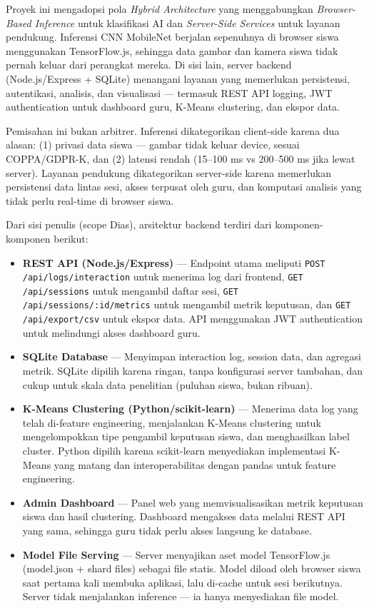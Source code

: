 Proyek ini mengadopsi pola \textit{Hybrid Architecture} yang menggabungkan \textit{Browser-Based Inference} untuk klasifikasi AI dan \textit{Server-Side Services} untuk layanan pendukung. Inferensi CNN MobileNet berjalan sepenuhnya di browser siswa menggunakan TensorFlow.js, sehingga data gambar dan kamera siswa tidak pernah keluar dari perangkat mereka. Di sisi lain, server backend (Node.js/Express + SQLite) menangani layanan yang memerlukan persistensi, autentikasi, analisis, dan visualisasi --- termasuk REST API logging, JWT authentication untuk dashboard guru, K-Means clustering, dan ekspor data.

Pemisahan ini bukan arbitrer. Inferensi dikategorikan client-side karena dua alasan: (1) privasi data siswa --- gambar tidak keluar device, sesuai COPPA/GDPR-K, dan (2) latensi rendah (15--100 ms vs 200--500 ms jika lewat server). Layanan pendukung dikategorikan server-side karena memerlukan persistensi data lintas sesi, akses terpusat oleh guru, dan komputasi analisis yang tidak perlu real-time di browser siswa.

Dari sisi penulis (scope Dias), arsitektur backend terdiri dari komponen-komponen berikut:

\begin{itemize}
    \item \textbf{REST API (Node.js/Express)} --- Endpoint utama meliputi \texttt{POST /api/logs/interaction} untuk menerima log dari frontend, \texttt{GET /api/sessions} untuk mengambil daftar sesi, \texttt{GET /api/sessions/:id/metrics} untuk mengambil metrik keputusan, dan \texttt{GET /api/export/csv} untuk ekspor data. API menggunakan JWT authentication untuk melindungi akses dashboard guru.
    \item \textbf{SQLite Database} --- Menyimpan interaction log, session data, dan agregasi metrik. SQLite dipilih karena ringan, tanpa konfigurasi server tambahan, dan cukup untuk skala data penelitian (puluhan siswa, bukan ribuan).
    \item \textbf{K-Means Clustering (Python/scikit-learn)} --- Menerima data log yang telah di-feature engineering, menjalankan K-Means clustering untuk mengelompokkan tipe pengambil keputusan siswa, dan menghasilkan label cluster. Python dipilih karena scikit-learn menyediakan implementasi K-Means yang matang dan interoperabilitas dengan pandas untuk feature engineering.
    \item \textbf{Admin Dashboard} --- Panel web yang memvisualisasikan metrik keputusan siswa dan hasil clustering. Dashboard mengakses data melalui REST API yang sama, sehingga guru tidak perlu akses langsung ke database.
    \item \textbf{Model File Serving} --- Server menyajikan aset model TensorFlow.js (model.json + shard files) sebagai file statis. Model diload oleh browser siswa saat pertama kali membuka aplikasi, lalu di-cache untuk sesi berikutnya. Server tidak menjalankan inference --- ia hanya menyediakan file model.
\end{itemize}

